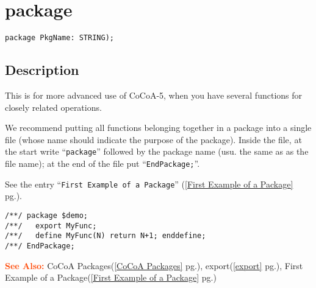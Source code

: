 \documentclass[a4paper]{mybook}
\newenvironment{command}{}{} %
\newcommand\SeeAlso{\par\textcolor{OrangeRed}{\textbf{\large See Also: }}}
\begin{document}
\section{package}
\label{package}
\begin{command} %


\begin{Verbatim}[label=syntax, rulecolor=\color{MidnightBlue},
frame=single]
package PkgName: STRING);
\end{Verbatim}


\subsection*{Description}

This is for more advanced use of CoCoA-5, when you have several
functions for closely related operations.
\par 
We recommend putting all functions belonging together in a package
into a single file (whose name should indicate the purpose of the
package).  Inside the file, at the start write ``\verb&package&''
followed by the package name (usu. the same as as the file name);
at the end of the file put ``\verb&EndPackage;&''.
\par 
See the entry ``\verb&First Example of a Package&'' (\ref{First Example of a Package} pg.\pageref{First Example of a Package}).
\begin{Verbatim}[label=example, rulecolor=\color{PineGreen}, frame=single]
/**/ package $demo;
/**/   export MyFunc;
/**/   define MyFunc(N) return N+1; enddefine;
/**/ EndPackage;
\end{Verbatim}


\SeeAlso %
  CoCoA Packages(\ref{CoCoA Packages} pg.\pageref{CoCoA Packages}), 
    export(\ref{export} pg.\pageref{export}), 
    First Example of a Package(\ref{First Example of a Package} pg.\pageref{First Example of a Package})
\end{command} %
\end{document}
